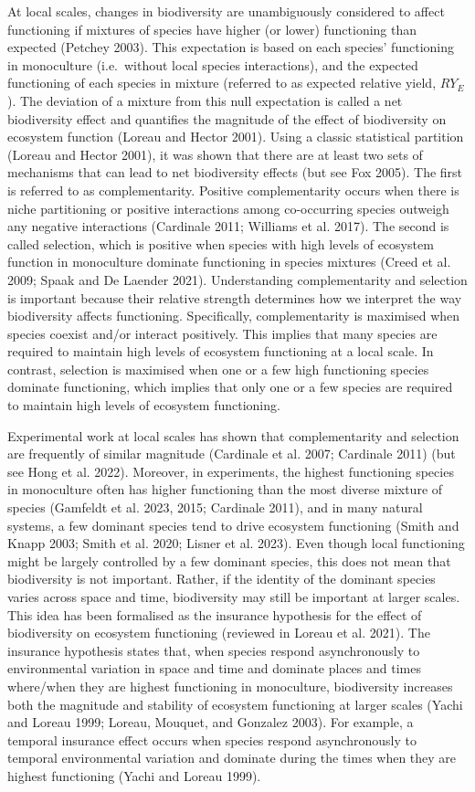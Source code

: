 \documentclass[
  letterpaper,
  DIV=11,
  numbers=noendperiod]{scrartcl}
\begin{document}
At local scales, changes in biodiversity are unambiguously considered to
affect functioning if mixtures of species have higher (or lower)
functioning than expected (Petchey 2003). This expectation is based on
each species' functioning in monoculture (i.e.~without local species
interactions), and the expected functioning of each species in mixture
(referred to as expected relative yield, \(RY_E\)). The deviation of a
mixture from this null expectation is called a net biodiversity effect
and quantifies the magnitude of the effect of biodiversity on ecosystem
function (Loreau and Hector 2001). Using a classic statistical partition
(Loreau and Hector 2001), it was shown that there are at least two sets
of mechanisms that can lead to net biodiversity effects (but see Fox
2005). The first is referred to as complementarity. Positive
complementarity occurs when there is niche partitioning or positive
interactions among co-occurring species outweigh any negative
interactions (Cardinale 2011; Williams et al. 2017). The second is
called selection, which is positive when species with high levels of
ecosystem function in monoculture dominate functioning in species
mixtures (Creed et al. 2009; Spaak and De Laender 2021). Understanding
complementarity and selection is important because their relative
strength determines how we interpret the way biodiversity affects
functioning. Specifically, complementarity is maximised when species
coexist and/or interact positively. This implies that many species are
required to maintain high levels of ecosystem functioning at a local
scale. In contrast, selection is maximised when one or a few high
functioning species dominate functioning, which implies that only one or
a few species are required to maintain high levels of ecosystem
functioning.

Experimental work at local scales has shown that complementarity and
selection are frequently of similar magnitude (Cardinale et al. 2007;
Cardinale 2011) (but see Hong et al. 2022). Moreover, in experiments,
the highest functioning species in monoculture often has higher
functioning than the most diverse mixture of species (Gamfeldt et al.
2023, 2015; Cardinale 2011), and in many natural systems, a few dominant
species tend to drive ecosystem functioning (Smith and Knapp 2003; Smith
et al. 2020; Lisner et al. 2023). Even though local functioning might be
largely controlled by a few dominant species, this does not mean that
biodiversity is not important. Rather, if the identity of the dominant
species varies across space and time, biodiversity may still be
important at larger scales. This idea has been formalised as the
insurance hypothesis for the effect of biodiversity on ecosystem
functioning (reviewed in Loreau et al. 2021). The insurance hypothesis
states that, when species respond asynchronously to environmental
variation in space and time and dominate places and times where/when
they are highest functioning in monoculture, biodiversity increases both
the magnitude and stability of ecosystem functioning at larger scales
(Yachi and Loreau 1999; Loreau, Mouquet, and Gonzalez 2003). For
example, a temporal insurance effect occurs when species respond
asynchronously to temporal environmental variation and dominate during
the times when they are highest functioning (Yachi and Loreau 1999).
\end{document}
